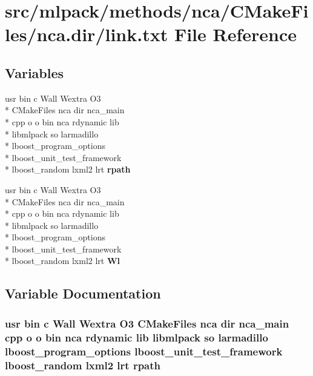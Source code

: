 \section{src/mlpack/methods/nca/\-C\-Make\-Files/nca.dir/link.txt File Reference}
\label{methods_2nca_2CMakeFiles_2nca_8dir_2link_8txt}
\subsection*{Variables}
\begin{DoxyCompactItemize}
\item 
usr bin c Wall Wextra O3 \\*
C\-Make\-Files nca dir nca\-\_\-main \\*
cpp o o bin nca rdynamic lib \\*
libmlpack so larmadillo \\*
lboost\-\_\-program\-\_\-options \\*
lboost\-\_\-unit\-\_\-test\-\_\-framework \\*
lboost\-\_\-random lxml2 lrt {\bf rpath}
\item 
usr bin c Wall Wextra O3 \\*
C\-Make\-Files nca dir nca\-\_\-main \\*
cpp o o bin nca rdynamic lib \\*
libmlpack so larmadillo \\*
lboost\-\_\-program\-\_\-options \\*
lboost\-\_\-unit\-\_\-test\-\_\-framework \\*
lboost\-\_\-random lxml2 lrt {\bf Wl}
\end{DoxyCompactItemize}


\subsection{Variable Documentation}
\subsubsection[{rpath}]{\setlength{\rightskip}{0pt plus 5cm}usr bin c Wall Wextra O3 C\-Make\-Files nca dir nca\-\_\-main cpp o o bin nca rdynamic lib libmlpack so larmadillo lboost\-\_\-program\-\_\-options lboost\-\_\-unit\-\_\-test\-\_\-framework lboost\-\_\-random lxml2 lrt rpath}\label{methods_2nca_2CMakeFiles_2nca_8dir_2link_8txt_ad3d48fc4135b4c18e015779b24236ebc}


